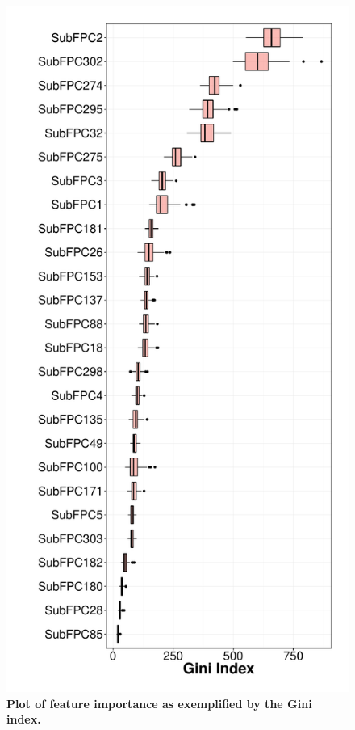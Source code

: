 \documentclass[fleqn,10pt]{wlpeerj}
\begin{document}
\begin{figure}[!ht]
\centering
\includegraphics[width = 0.7\linewidth]{Fig_Feature_Importance_Review}
\caption{\textbf{Plot of feature importance as exemplified by the Gini index.}} 
\label{fig:importance}
\end{figure}
\end{document}
